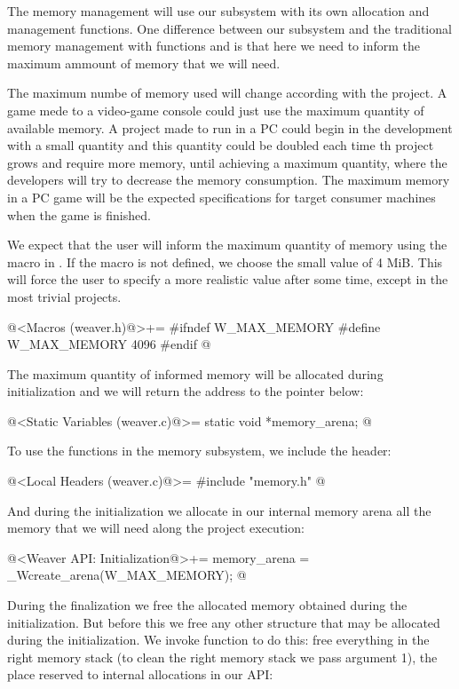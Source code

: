 The memory management will use our subsystem with its own allocation
and management functions. One difference between our subsystem and the
traditional memory management with functions 
and  is that here we need to inform the maximum
ammount of memory that we will need.

The maximum numbe of memory used will change according with the
project. A game mede to a video-game console could just use the
maximum quantity of available memory. A project made to run in a PC
could begin in the development with a small quantity and this quantity
could be doubled each time th project grows and require more memory,
until achieving a maximum quantity, where the developers will try to
decrease the memory consumption. The maximum memory in a PC game will
be the expected specifications for target consumer machines when the
game is finished.

We expect that the user will inform the maximum quantity of memory
using the macro 
in . If the macro is not defined, we choose
the small value of 4 MiB. This will force the user to specify a more
realistic value after some time, except in the most trivial projects.

\iniciocodigo
@<Macros (weaver.h)@>+=
#ifndef W_MAX_MEMORY
#define W_MAX_MEMORY 4096
#endif
@
\fimcodigo

The maximum quantity of informed memory will be allocated during
initialization and we will return the address to the pointer below:

\iniciocodigo
@<Static Variables (weaver.c)@>=
static void *memory_arena;
@
\fimcodigo

To use the functions in the memory subsystem, we include the header:

\iniciocodigo
@<Local Headers (weaver.c)@>=
#include "memory.h"
@
\fimcodigo

And during the initialization we allocate in our internal memory arena
all the memory that we will need along the project execution:

\iniciocodigo
@<Weaver API: Initialization@>+=
memory_arena = _Wcreate_arena(W_MAX_MEMORY);
@
\fimcodigo

During the finalization we free the allocated memory obtained during
the initialization. But before this we free any other structure that
may be allocated during the initialization. We invoke
function  to do this: free everything in the
right memory stack (to clean the right memory stack we pass argument
1), the place reserved to internal allocations in our API:

